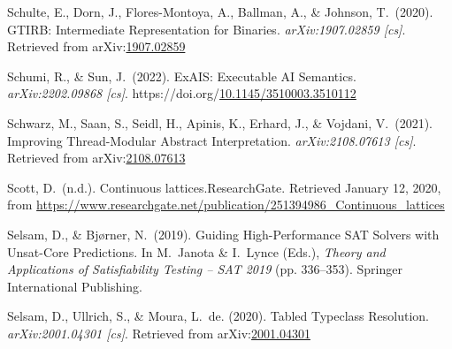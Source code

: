 \documentclass[12pt,twoside]{article}
\begin{document}
{\begin{thebibliography}{1079}
\mdbibitemlabel{}Schulte, E., Dorn, J., Flores-Montoya, A., Ballman, A., \& Johnson, T.~(2020). GTIRB: Intermediate Representation for Binaries. \emph{arXiv:1907.02859 {}[cs]}. Retrieved from arXiv:\href{http://arxiv.org/abs/1907.02859}{1907.02859}%

\mdbibitemlabel{}Schumi, R., \& Sun, J.~(2022). ExAIS: Executable AI Semantics. \emph{arXiv:2202.09868 {}[cs]}. https://doi.org/\href{https://dx.doi.org/10.1145/3510003.3510112}{10.1145/3510003.3510112}%

\mdbibitemlabel{}Schwarz, M., Saan, S., Seidl, H., Apinis, K., Erhard, J., \& Vojdani, V.~(2021). Improving Thread-Modular Abstract Interpretation. \emph{arXiv:2108.07613 {}[cs]}. Retrieved from arXiv:\href{http://arxiv.org/abs/2108.07613}{2108.07613}%

\mdbibitemlabel{}Scott, D.~(n.d.). Continuous lattices.ResearchGate. Retrieved January 12, 2020, from \href{https://www.researchgate.net/publication/251394986_Continuous_lattices}{{\ttfamily https://\hspace{0pt}www.\hspace{0pt}researchgate.\hspace{0pt}net/\hspace{0pt}publication/\hspace{0pt}251394986\_\hspace{0pt}Continuous\_\hspace{0pt}lattices}}%

\mdbibitemlabel{}Selsam, D., \& Bjørner, N.~(2019). Guiding High-Performance SAT Solvers with Unsat-Core Predictions. In M.~Janota \& I.~Lynce (Eds.), \emph{Theory and Applications of Satisfiability Testing – SAT 2019} (pp. 336–353). Springer International Publishing.%

\mdbibitemlabel{}Selsam, D., Ullrich, S., \& Moura, L.~de. (2020). Tabled Typeclass Resolution. \emph{arXiv:2001.04301 {}[cs]}. Retrieved from arXiv:\href{http://arxiv.org/abs/2001.04301}{2001.04301}%


\end{thebibliography}}
\end{document}
